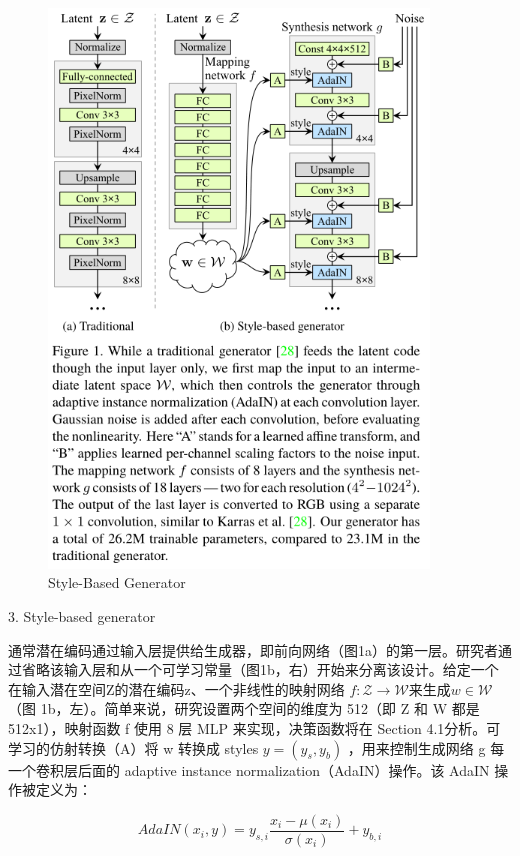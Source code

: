 \begin{figure}[htb]
\centering 
\includegraphics[width=0.9\textwidth]{img/m2t24.png} 
\caption{Style-Based Generator}
\label{Test}
\end{figure}

3. Style-based generator

通常潜在编码通过输入层提供给生成器，即前向网络（图1a）的第一层。研究者通过省略该输入层和从一个可学习常量（图1b，右）开始来分离该设计。给定一个在输入潜在空间Z的潜在编码z、一个非线性的映射网络 $f:\mathcal{Z}\rightarrow\mathcal{W}$来生成$w\in\mathcal{W}$（图 1b，左）。简单来说，研究设置两个空间的维度为 512（即 Z 和 W 都是 512x1），映射函数 f 使用 8 层 MLP 来实现，决策函数将在 Section 4.1分析。可学习的仿射转换（A）将 w 转换成 styles $y=\left(y_s,y_b\right)$ ，用来控制生成网络 g 每一个卷积层后面的 adaptive instance    normalization（AdaIN）操作。该 AdaIN 操作被定义为：

\begin{equation}
AdaIN\left(x_i,y\right)=y_{s,i}\frac{x_i-\mu\left(x_i\right)}{\sigma\left(x_i\right)}+y_{b,i}
\end{equation}

